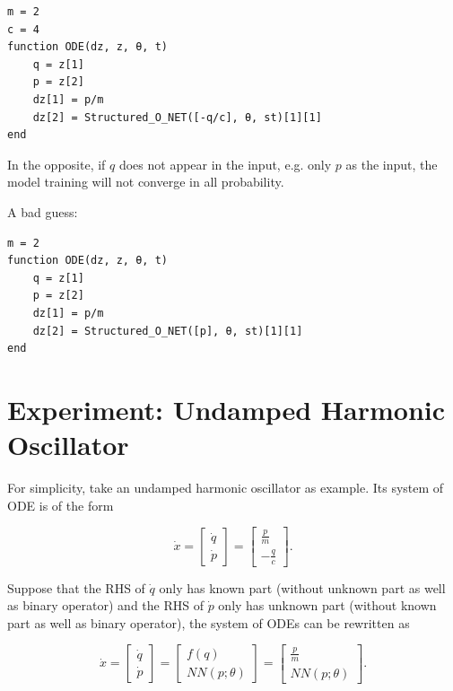 \documentclass[
	parskip, 			   %
	twoside, 			   %
	DIV=14, 			   %
	BCOR=15.0mm, 		   %
	headsepline, 		   %
	open=right, 		   %
	captions=tableheading, %
	bibliography=totoc,    %
	numbers=noenddot       %
]{scrreprt}
\begin{document}
\begin{verbatim}
m = 2
c = 4
function ODE(dz, z, θ, t)
    q = z[1]
    p = z[2]
    dz[1] = p/m
    dz[2] = Structured_O_NET([-q/c], θ, st)[1][1]
end
\end{verbatim}

In the opposite, if $q$ does not appear in the input, e.g. only $p$ as the input, the model training will not converge in all probability.

A bad guess:

\begin{verbatim}
m = 2
function ODE(dz, z, θ, t)
    q = z[1]
    p = z[2]
    dz[1] = p/m
    dz[2] = Structured_O_NET([p], θ, st)[1][1]
end
\end{verbatim}

\section{Experiment: Undamped Harmonic Oscillator}
For simplicity, take an undamped harmonic oscillator as example. Its system of ODE is of the form

\begin{equation}
    \label{eq:ODE_udho}
    \dot{x} =
    \begin{bmatrix}
    \dot{q}\\
    \dot{p}
    \end{bmatrix}
    =
    \begin{bmatrix}
    \frac{p}{m}\\
    -\frac{q}{c}
    \end{bmatrix}.
\end{equation}

Suppose that the RHS of $\dot{q}$ only has known part (without unknown part as well as binary operator) and the RHS of $\dot{p}$ only has unknown part (without known part as well as binary operator), the system of ODEs can be rewritten as

\begin{equation}
    \label{eq:structured_ODE_udho}
    \dot{x} =
    \begin{bmatrix}
    \dot{q}\\
    \dot{p}
    \end{bmatrix}
    =
    \begin{bmatrix}
    {f(q)}\\
    {NN(p;\theta)}
    \end{bmatrix}
    =
    \begin{bmatrix}
    \frac{p}{m}\\
    NN(p;\theta)
    \end{bmatrix}.
\end{equation}
\end{document}

